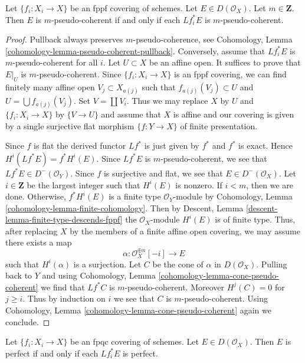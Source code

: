 \begin{lemma}
\label{lemma-pseudo-coherent-descends-fppf}
Let $\{f_i : X_i \to X\}$ be an fppf covering of schemes. Let
$E \in D(\mathcal{O}_X)$. Let $m \in \mathbf{Z}$.
Then $E$ is $m$-pseudo-coherent if and only if each
$Lf_i^*E$ is $m$-pseudo-coherent.
\end{lemma}

\begin{proof}
Pullback always preserves $m$-pseudo-coherence, see
Cohomology, Lemma \ref{cohomology-lemma-pseudo-coherent-pullback}.
Conversely, assume that $Lf_i^*E$ is $m$-pseudo-coherent for all $i$.
Let $U \subset X$ be an affine open. It suffices to prove that
$E|_U$ is $m$-pseudo-coherent. Since $\{f_i : X_i \to X\}$ is an
fppf covering, we can find finitely many affine open $V_j \subset X_{a(j)}$
such that $f_{a(j)}(V_j) \subset U$ and $U = \bigcup f_{a(j)}(V_j)$.
Set $V = \coprod V_i$.
Thus we may replace $X$ by $U$ and $\{f_i : X_i \to X\}$ by
$\{V \to U\}$ and assume that $X$ is affine and our covering
is given by a single surjective flat morphism $\{f : Y \to X\}$
of finite presentation.

\medskip\noindent
Since $f$ is flat the derived functor $Lf^*$ is just given by $f^*$ and $f^*$
is exact. Hence $H^i(Lf^*E) = f^*H^i(E)$. Since $Lf^*E$ is $m$-pseudo-coherent,
we see that $Lf^*E \in D^-(\mathcal{O}_Y)$. Since $f$ is surjective and flat,
we see that $E \in D^-(\mathcal{O}_X)$. Let $i \in \mathbf{Z}$ be the largest
integer such that $H^i(E)$ is nonzero. If $i < m$, then we are done. Otherwise,
$f^*H^i(E)$ is a finite type $\mathcal{O}_Y$-module by
Cohomology, Lemma \ref{cohomology-lemma-finite-cohomology}.
Then by Descent, Lemma \ref{descent-lemma-finite-type-descends-fppf}
the $\mathcal{O}_X$-module $H^i(E)$ is of finite type.
Thus, after replacing $X$ by the members of a finite affine open covering,
we may assume there exists a map
$$
\alpha : \mathcal{O}_X^{\oplus n}[-i] \longrightarrow E
$$
such that $H^i(\alpha)$ is a surjection. Let $C$ be the cone of $\alpha$
in $D(\mathcal{O}_X)$. Pulling back to $Y$ and using
Cohomology, Lemma \ref{cohomology-lemma-cone-pseudo-coherent}
we find that $Lf^*C$ is $m$-pseudo-coherent. Moreover $H^j(C) = 0$
for $j \geq i$. Thus by induction on $i$ we see that $C$ is
$m$-pseudo-coherent. Using
Cohomology, Lemma \ref{cohomology-lemma-cone-pseudo-coherent}
again we conclude.
\end{proof}

\begin{lemma}
\label{lemma-perfect-descends-fpqc}
Let $\{f_i : X_i \to X\}$ be an fpqc covering of schemes. Let
$E \in D(\mathcal{O}_X)$. Then $E$ is perfect
if and only if each $Lf_i^*E$ is perfect.
\end{lemma}

